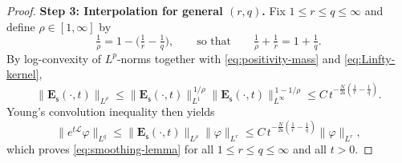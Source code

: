 \documentclass[10pt,a4paper]{amsart}
\newcommand{\ts}{\mathsf{s}}
\begin{document}
\begin{proof}
\medskip
\noindent\textbf{Step 3: Interpolation for general $(r,q)$.}
Fix $1\leq r\leq q\leq\infty$ and define $\rho\in[1,\infty]$ by
\[
\tfrac{1}{\rho}=1-\bigl(\tfrac{1}{r}-\tfrac{1}{q}\bigr),
\qquad\text{so that}\qquad
\tfrac{1}{\rho}+\tfrac{1}{r}=1+\tfrac{1}{q}.
\]
By log-convexity of $L^{p}$-norms together with \eqref{eq:positivity-mass} and \eqref{eq:Linfty-kernel},
\[
\|\mathbf{E}_{\ts}(\cdot,t)\|_{L^{\rho}}
\leq\|\mathbf{E}_{\ts}(\cdot,t)\|_{L^{1}}^{\,1/\rho}
\|\mathbf{E}_{\ts}(\cdot,t)\|_{L^{\infty}}^{\,1-1/\rho}
\leq C\,t^{-\frac{N}{2\ts}\left(\frac{1}{r}-\frac{1}{q}\right)}.
\]
Young's convolution inequality then yields
\[
\|e^{t\mathscr{L}}\varphi\|_{L^{q}}
\leq\|\mathbf{E}_{\ts}(\cdot,t)\|_{L^{\rho}}\|\varphi\|_{L^{r}}
\leq C\,t^{-\frac{N}{2\ts}\left(\frac{1}{r}-\frac{1}{q}\right)}\|\varphi\|_{L^{r}},
\]
which proves \eqref{eq:smoothing-lemma} for all $1\leq r\leq q\leq\infty$ and all $t>0$.
\end{proof}
\end{document}
